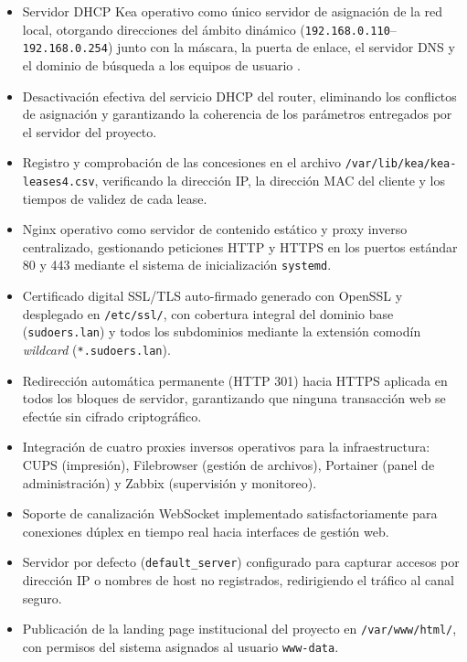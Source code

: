 \begin{itemize}
  \item Servidor DHCP Kea operativo como único servidor de asignación de la
        red local, otorgando direcciones del ámbito dinámico
        (\texttt{192.168.0.110}--\texttt{192.168.0.254}) junto con la
        máscara, la puerta de enlace, el servidor DNS y el dominio de
        búsqueda a los equipos de usuario \cite{keaDocs}.
  \item Desactivación efectiva del servicio DHCP del router, eliminando los
        conflictos de asignación y garantizando la coherencia de los
        parámetros entregados por el servidor del proyecto.
  \item Registro y comprobación de las concesiones en el archivo
        \texttt{/var/lib/kea/kea-leases4.csv}, verificando la dirección IP,
        la dirección MAC del cliente y los tiempos de validez de cada lease.
  \item Nginx operativo como servidor de contenido estático y proxy inverso
        centralizado, gestionando peticiones HTTP y HTTPS en los puertos estándar
        80 y 443 mediante el sistema de inicialización \texttt{systemd}.
  \item Certificado digital SSL/TLS auto-firmado generado con OpenSSL y
        desplegado en \texttt{/etc/ssl/}, con cobertura integral del dominio
        base (\texttt{sudoers.lan}) y todos los subdominios mediante la
        extensión comodín \textit{wildcard} (\texttt{*.sudoers.lan}).
  \item Redirección automática permanente (HTTP 301) hacia HTTPS aplicada en
        todos los bloques de servidor, garantizando que ninguna transacción web
        se efectúe sin cifrado criptográfico.
  \item Integración de cuatro proxies inversos operativos para la
        infraestructura: CUPS (impresión), Filebrowser (gestión de archivos),
        Portainer (panel de administración) y Zabbix (supervisión y monitoreo).
  \item Soporte de canalización WebSocket implementado satisfactoriamente para
        conexiones dúplex en tiempo real hacia interfaces de gestión web.
  \item Servidor por defecto (\texttt{default\_server}) configurado para
        capturar accesos por dirección IP o nombres de host no registrados,
        redirigiendo el tráfico al canal seguro.
  \item Publicación de la landing page institucional del proyecto en
        \texttt{/var/www/html/}, con permisos del sistema asignados al usuario
        \texttt{www-data}.
\end{itemize}

